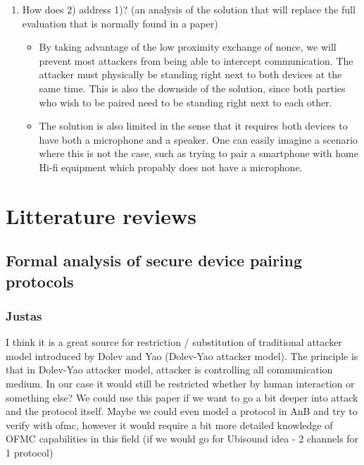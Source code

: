 \documentclass[12pt]{article}
\begin{document}
\begin{enumerate}
    \item How does 2) address 1)?  (an analysis of the solution that will replace the full evaluation that is normally found in a paper)

    \begin{itemize}
        \item By taking advantage of the low proximity exchange of nonce, we will prevent most attackers from being able to intercept communication. The attacker must physically be standing right next to both devices at the same time.
        This is also the downside of the solution, since both parties who wish to be paired need to be standing right next to each other.
        \item The solution is also limited in the sense that it requires both devices to have both a microphone and a speaker. One can easily imagine a scenario where this is not the case, such as trying to pair a smartphone with home Hi-fi equipment which propably does not have a microphone.
    \end{itemize}

\end{enumerate}

\newpage

\section{Litterature reviews}

\subsection{Formal analysis of secure device pairing protocols}
\label{sub:Formal analysis of secure device pairing protocols}

\subsubsection{Justas}
\label{subs:Justas}

I think it is a great source for restriction / substitution of traditional attacker model introduced by Dolev and Yao (Dolev-Yao attacker model).
The principle is that in Dolev-Yao attacker model, attacker is controlling all communication medium. In our case it would still be restricted whether by human interaction or something else?
We could use this paper if we want to go a bit deeper into attack and the protocol itself. Maybe we could even model a protocol in AnB and  try to verify with ofmc, however it would require a bit more detailed knowledge of OFMC capabilities in this field (if we would go for Ubisound idea - 2 channels for 1 protocol)
\end{document}
